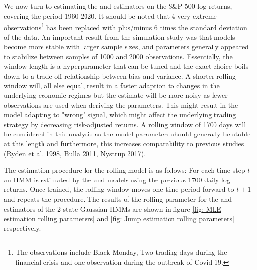 We now turn to estimating the \mle and \jump estimators on the S\&P 500 log returns, covering the period 1960-2020. It should be noted that 4 very extreme observations\footnote{The observations include Black Monday, Two trading days during the financial crisis and one observation during the outbreak of Covid-19.
}
has been replaced with plus/minus 6 times the standard deviation of the data. An important result from the simulation study was that models become more stable with larger sample sizes, and parameters generally appeared to stabilize between samples of 1000 and 2000 observations. Essentially, the window length is a hyperparameter that can be tuned and the exact choice boils down to a trade-off relationship between bias and variance. A shorter rolling window will, all else equal, result in a faster adaption to changes in the underlying economic regimes but the estimate will be more noisy as fewer observations are used when deriving the parameters. This might result in the model adapting to "wrong" signal, which might affect the underlying trading strategy by decreasing risk-adjusted returns. A rolling window of 1700 days will be considered in this analysis as the model parameters should generally be stable at this length and furthermore, this increases comparability to previous studies (Ryden et al. 1998, Bulla 2011, Nystrup 2017).

The estimation procedure for the rolling model is as follows: For each time step $t$ an HMM is estimated by the \mle and \jump models using the previous 1700 daily log returns. Once trained, the rolling window moves one time period forward to $t+1$ and repeats the procedure. The results of the rolling parameter for the \mle and \jump estimators of the 2-state Gaussian HMMs are shown in figure \ref{fig: MLE estimation rolling parameters} and \ref{fig: Jump estimation rolling parameters} respectively.

